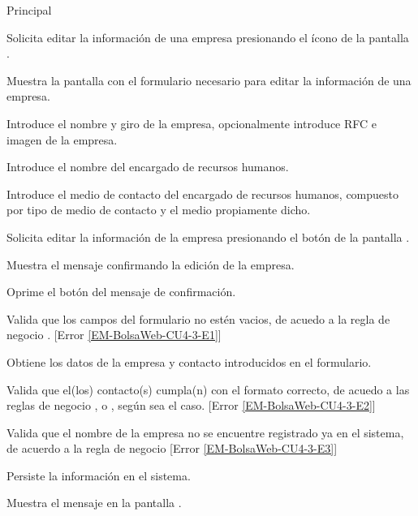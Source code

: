 \begin{UCtrayectoria}{Principal}

	\UCpaso [\UCactor] Solicita editar la información de una empresa presionando el ícono  de la pantalla . 

	\UCpaso Muestra la pantalla  con el formulario necesario para editar la información de una empresa. \label{EM-BolsaWeb-CU4-3-DatosObligatorios}

	\UCpaso [\UCactor] Introduce el nombre y giro de la empresa, opcionalmente introduce RFC e imagen de la empresa. 

	\UCpaso [\UCactor] Introduce el nombre del encargado de recursos humanos.

	\UCpaso [\UCactor] Introduce el medio de contacto del encargado de recursos humanos, compuesto por tipo de medio de contacto y el medio propiamente dicho. \label{EM-BolsaWeb-CU4-3-AgregarContacto}

	\UCpaso [\UCactor] Solicita editar la información de la empresa presionando el botón  de la pantalla .   

	\UCpaso Muestra el mensaje  confirmando la edición de la empresa. 

	\UCpaso [\UCactor] Oprime el botón  del mensaje de confirmación.  

	\UCpaso Valida que los campos del formulario no estén vacios, de acuedo a la regla de negocio . [Error \ref{EM-BolsaWeb-CU4-3-E1}] 

	\UCpaso Obtiene los datos de la empresa y contacto introducidos en el formulario. 

	\UCpaso Valida que el(los) contacto(s) cumpla(n) con el formato correcto, de acuedo a las reglas de negocio ,  o , según sea el caso. [Error \ref{EM-BolsaWeb-CU4-3-E2}] 

	\UCpaso Valida que el nombre de la empresa no se encuentre registrado ya en el sistema, de acuerdo a la regla de negocio  [Error \ref{EM-BolsaWeb-CU4-3-E3}] 
	
	\UCpaso Persiste la información en el sistema.

	\UCpaso Muestra el mensaje  en la pantalla . 
\end{UCtrayectoria}

